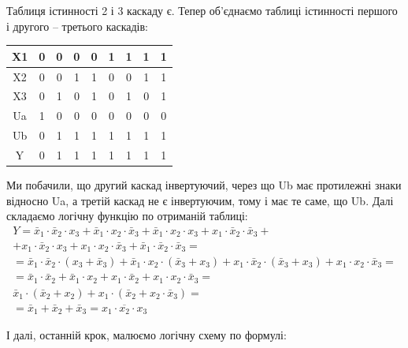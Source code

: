 \documentclass[a4paper,14pt]{extreport}
\begin{document}
Таблиця істинності 2 і 3 каскаду є. Тепер об’єднаємо таблиці істинності першого і другого – третього каскадів:


\begin{table}[h]
  \begin{center}
\begin{tabular}{|c|c|c|c|c|c|c|c|c|}
\hline
X1 & 0 & 0 & 0 & 0 & 1 & 1 & 1 & 1 \\ \hline
X2 & 0 & 0 & 1 & 1 & 0 & 0 & 1 & 1 \\ \hline
X3 & 0 & 1 & 0 & 1 & 0 & 1 & 0 & 1 \\ \hline
Ua & 1 & 0 & 0 & 0 & 0 & 0 & 0 & 0 \\ \hline
Ub & 0 & 1 & 1 & 1 & 1 & 1 & 1 & 1 \\ \hline
Y  & 0 & 1 & 1 & 1 & 1 & 1 & 1 & 1 \\ \hline
\end{tabular}
  \end{center}
\end{table}

Ми побачили, що другий каскад інвертуючий, через що Ub має протилежні знаки відносно Ua, а третій каскад не є інвертуючим, тому і має те саме, що Ub.
Далі складаємо логічну функцію по отриманій таблиці:
\begin{equation}
\begin{array}{c}
Y=\bar{x}_{1} \cdot \bar{x}_{2} \cdot x_{3}+\bar{x}_{1} \cdot x_{2} \cdot \bar{x}_{3}+\bar{x}_{1} \cdot x_{2} \cdot x_{3}+x_{1} \cdot \bar{x}_{2} \cdot \bar{x}_{3}+ \\
+x_{1} \cdot \bar{x}_{2} \cdot x_{3}+x_{1} \cdot x_{2} \cdot \bar{x}_{3}+\bar{x}_{1} \cdot \bar{x}_{2} \cdot \bar{x}_{3}= \\
=\bar{x}_{1} \cdot \bar{x}_{2} \cdot\left(x_{3}+\bar{x}_{3}\right)+\bar{x}_{1} \cdot x_{2} \cdot\left(\bar{x}_{3}+x_{3}\right)+x_{1} \cdot \bar{x}_{2} \cdot\left(\bar{x}_{3}+x_{3}\right)+x_{1} \cdot x_{2} \cdot \bar{x}_{3}= \\
=\bar{x}_{1} \cdot \bar{x}_{2}+\bar{x}_{1} \cdot x_{2}+x_{1} \cdot \bar{x}_{2}+x_{1} \cdot x_{2} \cdot \bar{x}_{3}=\\
\bar{x}_{1} \cdot\left(\bar{x}_{2}+x_{2}\right)+x_{1} \cdot\left(\bar{x}_{2}+x_{2} \cdot \bar{x}_{3}\right)= \\
=\bar{x}_{1}+\bar{x}_{2}+\bar{x}_{3}=\overline{x_{1} \cdot x_{2} \cdot x_{3}}
\end{array}
\end{equation}



І далі, останній крок, малюємо логічну схему по формулі:


\begin{figure}[h!]
\label{ris6}
\end{figure}
\end{document}
